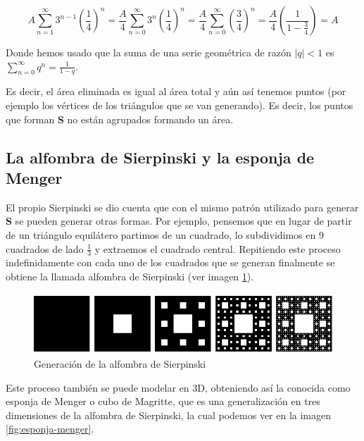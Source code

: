 $$
A \sum_{n=1}^\infty 3^{n-1}\left(\frac 1 4\right)^n  = \frac A 4  \sum_{n=0}^\infty 3^n\left(\frac 1 4\right)^n =  \frac A 4  \sum_{n=0}^\infty \left(\frac 3 4\right)^n = \frac{A}{4} \left(\frac{1}{1-\frac{3}{4}}\right) = A
$$

Donde hemos usado que la suma de una serie geométrica de razón $|q|<1$ es $\sum_{n=0}^\infty q^n = \frac{1}{1-q}$.

Es decir, el área eliminada es igual al área total y aún así tenemos puntos (por ejemplo los vértices de los triángulos que se van generando). Es decir, los puntos que forman \textbf{S} no están agrupados formando un área.

\subsection{La alfombra de Sierpinski y la esponja de Menger}
\label{subsection:alfombra-esponja}

El propio Sierpinski se dio cuenta que con el mismo patrón utilizado para generar \textbf{S} se pueden generar otras formas. Por ejemplo, pensemos que en lugar de partir de un triángulo equilátero partimos de un cuadrado, lo subdividimos en 9 cuadrados de lado $\frac 1 3$ y extraemos el cuadrado central. Repitiendo este proceso indefinidamente con cada uno de los cuadrados que se generan finalmente se obtiene la llamada alfombra de Sierpinski (ver imagen \ref{fig:alfombra-Sierpinski}).

\begin{figure} [h]
\centering
\includegraphics[scale = 0.6]{img/Sierpinski-carpet.png}
\caption{Generación de la alfombra de Sierpinski}
 \label{fig:alfombra-Sierpinski}
\end{figure}

Este proceso también se puede modelar en 3D, obteniendo así la conocida como esponja de Menger o cubo de Magritte, que es una generalización en tres dimensiones de la alfombra de Sierpinski, la cual podemos ver en la imagen \ref{fig:esponja-menger}.


